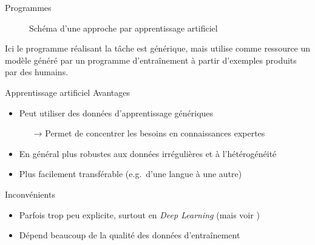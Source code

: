 \documentclass[hyperref={unicode}, xcolor={svgnames}, french]{beamer}
\begin{document}
\begin{frame}[fragile]{Programmes}
    \begin{figure}
        \tikzset{external/export=true}
        \caption{Schéma d'une approche par apprentissage artificiel}
    \end{figure}
    Ici le \textcolor{highlighta}{programme réalisant la tâche} est générique, mais utilise comme ressource un \textcolor{highlight3}{modèle} généré par un \textcolor{highlight6}{programme d'entraînement} à partir d'\textcolor{highlight7}{exemples} produits par des humains.
\end{frame}

\begin{frame}{Apprentissage artificiel}
    Avantages
    \begin{itemize}
        \item Peut utiliser des données d'apprentissage génériques
            \begin{itemize}
                \item[→] Permet de concentrer les besoins en connaissances expertes
            \end{itemize}
        \item En général plus \alert{robustes} aux données irrégulières et à l'hétérogénéité
        \item Plus facilement \alert{transférable} (e.g.\ d'une langue à une autre)
    \end{itemize}
    Inconvénients
    \begin{itemize}
        \item Parfois trop peu \alert{explicite}, surtout en \textit{Deep Learning} (mais voir )
        \item Dépend beaucoup de la qualité des données d'entraînement
    \end{itemize}
\end{frame}
\end{document}
